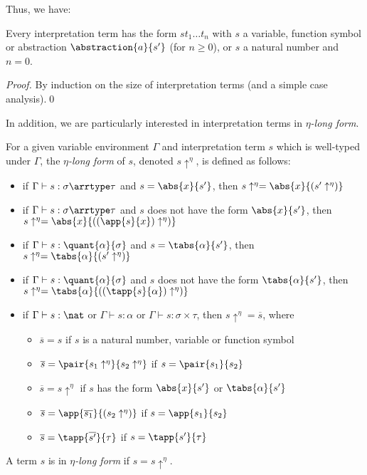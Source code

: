 Thus, we have:

\begin{lemma}\label{lem_abusive_notation}
  Every interpretation term has the form $s t_1 \dots t_n$ with $s$ a
  variable, function symbol or abstraction $\abstraction{a}{s'}$ (for
  $n \geq 0$), or $s$ a natural number and $n = 0$.
\end{lemma}

\begin{proof}
By induction on the size of interpretation terms (and a simple case
analysis).\qed
\end{proof}

\newcommand{\arreta}{\rightarrow_\eta}
\newcommand{\etalong}[1]{#1\uparrow^\eta}
\newcommand{\almostetalong}[1]{\overline{#1}}

In addition, we are particularly interested in interpretation terms in
\emph{$\eta$-long form}.

\begin{definition}
For a given variable environment $\Gamma$ and interpretation term $s$
which is well-typed under $\Gamma$, the \emph{$\eta$-long form} of $s$,
denoted $\etalong{s}$, is defined as follows:
\begin{itemize}
\item if $\Gamma \vdash s : \sigma \arrtype \tau$ and $s = \abs{x}{s'}$,
  then $\etalong{s} =  \abs{x}{(\etalong{s'})}$
\item if $\Gamma \vdash s : \sigma \arrtype \tau$ and $s$ does not have
  the form $\abs{x}{s'}$, then $\etalong{s} =  \abs{x}{(
  \etalong{(\app{s}{x})})}$
\item if $\Gamma \vdash s : \quant{\alpha}{\sigma}$ and $s = \tabs{
  \alpha}{s'}$, then $\etalong{s} = \tabs{\alpha}{(\etalong{s'})}$
\item if $\Gamma \vdash s : \quant{\alpha}{\sigma}$ and $s$ does not have
  the form $\tabs{\alpha}{s'}$, then $\etalong{s} = \tabs{\alpha}{
  (\etalong{(\tapp{s}{\alpha})})}$
\item if $\Gamma \vdash s : \nat$ or $\Gamma \vdash s : \alpha$ or
  $\Gamma \vdash s : \sigma \times \tau$, then $\etalong{s} =
  \almostetalong{s}$, where
  \begin{itemize}
  \item $\almostetalong{s} = s$ if $s$ is a natural number, variable or
    function symbol
  \item $\almostetalong{s} = \pair{\etalong{s_1}}{\etalong{s_2}}$ if
    $s = \pair{s_1}{s_2}$
  \item $\almostetalong{s} = \etalong{s}$ if $s$ has the form
    $\abs{x}{s'}$ or $\tabs{\alpha}{s'}$
  \item $\almostetalong{s} = \app{\almostetalong{s_1}}{(\etalong{s_2})}$
    if $s = \app{s_1}{s_2}$
  \item $\almostetalong{s} = \tapp{\almostetalong{s'}}{\tau}$
    if $s = \tapp{s'}{\tau}$
  \end{itemize}
\end{itemize}
A term $s$ is in \emph{$\eta$-long form} if $s = \etalong{s}$.
\end{definition}

